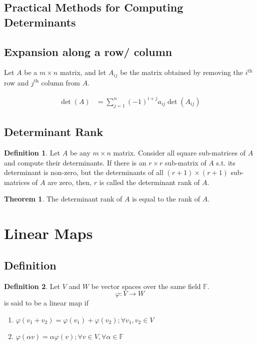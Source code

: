 \documentclass[fleqn, a4paper, 12pt]{article}
\theoremstyle{definition}
\newtheorem{definition}{Definition} %
\theoremstyle{theorem}
\newtheorem{theorem}{Theorem} %
\theoremstyle{remark}
\numberwithin{equation}{theorem}
\begin{document}
\subsection{Practical Methods for Computing Determinants}

\subsection{Expansion along a row/ column}

Let $A$ be a $m \times n$ matrix, and let $A_{ij}$ be the matrix obtained by removing the $i^{\text{th}}$ row and $j^{\text{th}}$ column from $A$.

\begin{align*}
	\det (A) &= \sum_{j = 1}^{n} (-1)^{i + j} a_{ij} \det (A_{ij})
\end{align*}

\subsection{Determinant Rank}

\begin{definition}
	Let $A$ be any $m \times n$ matrix. Consider all square sub-matrices of $A$ and compute their determinants. If there is an $r \times r$ sub-matrix of $A$ s.t. its determinant is non-zero, but the determinants of all $(r + 1) \times (r + 1)$ sub-matrices of $A$ are zero, then, $r$ is called the determinant rank of $A$.
\end{definition}

\begin{theorem}
	The determinant rank of $A$ is equal to the rank of $A$.
\end{theorem}

\section{Linear Maps}

\subsection{Definition}

\begin{definition}
	Let $V$ and $W$ be vector spaces over the same field $\mathbb{F}$. 
	\begin{equation*}
		\varphi : V \to W
	\end{equation*}
	is said to be a linear map if
	\begin{enumerate}
		\item $\varphi(v_1 + v_2) = \varphi(v_1) + \varphi(v_2) ; \forall v_1, v_2 \in V$
		\item $\varphi(\alpha v) = \alpha \varphi(v) ; \forall v \in V, \forall \alpha \in \mathbb{F}$
	\end{enumerate}
\end{definition}
\end{document}
